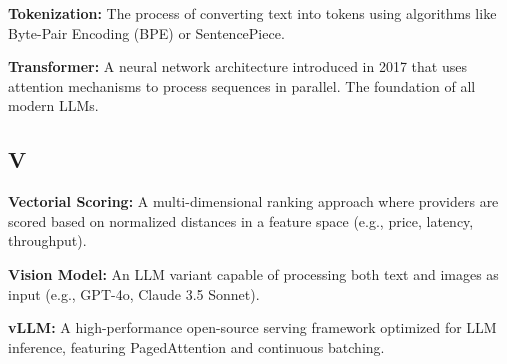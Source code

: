 \documentclass[english]{article}
\begin{document}
\textbf{Tokenization:} The process of converting text into tokens using algorithms like Byte-Pair Encoding (BPE) or SentencePiece.

\textbf{Transformer:} A neural network architecture introduced in 2017 that uses attention mechanisms to process sequences in parallel. The foundation of all modern LLMs.

\subsection*{V}

\textbf{Vectorial Scoring:} A multi-dimensional ranking approach where providers are scored based on normalized distances in a feature space (e.g., price, latency, throughput).

\textbf{Vision Model:} An LLM variant capable of processing both text and images as input (e.g., GPT-4o, Claude 3.5 Sonnet).

\textbf{vLLM:} A high-performance open-source serving framework optimized for LLM inference, featuring PagedAttention and continuous batching.

\newpage

\printbibliography
\end{document}
